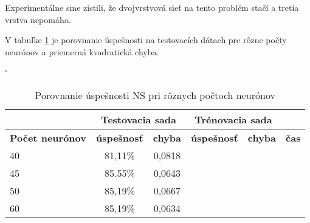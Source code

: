 Experimentálne sme zistili, že dvojvrstvová sieť na tento problém stačí a tretia vrstva nepomáha.

{\color{red}
V tabuľke \ref{tab:neuroncountcmp} je porovnanie úspešnosti na testovacích dátach pre rôzne počty neurónov a priemerná kvadratická chyba.
}

\begin{table}[h]
\catcode` %
\centering
\begin{tabular}{|l|c|c|c|c|c|}
\cline{2-5}
\multicolumn{1}{l}{} & \multicolumn{2}{|c|}{\textbf{Testovacia sada}} & \multicolumn{2}{c|}{\textbf{Trénovacia sada}} & \multicolumn{1}{l}{}\\ 
\hline
\textbf{Počet neurónov} & \textbf{úspešnosť} & \textbf{chyba} & \textbf{úspešnosť} & \textbf{chyba} & \textbf{čas} \\ \hline
40 & 81,11\% & 0,0818 & & &\\ \hline
45 & 85.55\% & 0,0643 & & &\\ \hline
50 & 85,19\% & 0,0667 & & &\\ \hline
60 & 85,19\% & 0,0634 & & &\\ 
\hline
\end{tabular}
\caption{Porovnanie úspešnosti NS pri rôznych počtoch neurónov}
\label{tab:neuroncountcmp}
\end{table}





